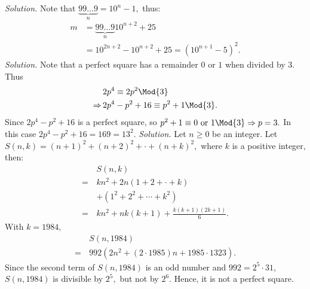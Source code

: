\begin{multicols}{2}
	\textit{Solution.}
	Note that $\underbrace{99 \ldots 9}_{n} = 10^n-1,$ thus:
	\begin{align*}
		m &= \underbrace{99 \ldots 9}_{n} 10^{n+2} + 25 \\
		&= 10^{2n+2} - 10^{n+2} + 25 = {(10^{n+1} - 5)^2.}
	\end{align*}
	\vskip 0.1cm
	\textit{Solution.}
		Note that a perfect square has a remainder $0$ or $1$ when divided by $3$.
		Thus 
		\begin{align*}
			&2p^4 \equiv 2p^2 \Mod{3} \\
			\Rightarrow \,&2p^4-p^2 + 16 \equiv p^2 + 1 \Mod{3}.
		\end{align*}	
		Since $2p^4-p^2 + 16$ is a perfect square, so $p^2 + 1 \equiv 0 \text{\ or\ } 1 \Mod{3} \Rightarrow {p = 3.}$
		In this case $2p^4-p^2 + 16 = 169 = 13^2.$
	\vskip 0.1cm
	\vskip 0.2cm
	\textit{Solution.}
	Let $n \ge 0$ be an integer. Let $S(n, k) = (n+1)^2 + (n+2)^2 + \cdot + (n+k)^2,$ where $k$ is a positive integer, then:
	\begin{align*}
		&S(n, k) \\
		= \,&kn^2 + 2n(1+2+\cdot +k)\\
		&+(1^2+2^2+\cdots+k^2)\\
		= \,&kn^2 + nk(k+1) + \frac{k(k+1)(2k+1)}{6}.
	\end{align*}		
	With $k=1984,$ 
	\begin{align*}
		&S(n, 1984) \\
		= \,&992 (2n^2+(2\cdot 1985)n+ 1985\cdot 1323).
	\end{align*}
	Since the second term of $S(n, 1984)$ is an odd number and $992 = 2^5 \cdot 31,$ $S(n, 1984)$ is divisible by $2^5,$ 
	but not by $2^6.$ Hence, it is not a perfect square.
\end{multicols}
